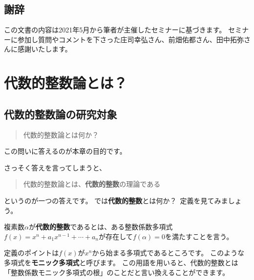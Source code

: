 \documentclass[11pt,b5paper,oneside,titlepage,lualatex]{ltjsreport}
\begin{document}
\section*{謝辞}


この文書の内容は2021年5月から筆者が主催したセミナーに基づきます。
セミナーに参加し質問やコメントを下さった庄司幸弘さん、前畑佑都さん、田中拓弥さんに感謝いたします。

\clearpage

\tableofcontents


\chapter{代数的整数論とは？} \label{chap:代数的整数論とは}



\section{代数的整数論の研究対象} \label{sec:代数的整数論の研究対象}


\begin{quote}
	\centering
	代数的整数論とは何か？
\end{quote}
この問いに答えるのが本章の目的です。

さっそく答えを言ってしまうと、
\begin{quote}
	\centering
	代数的整数論とは、\textbf{代数的整数}の理論である
\end{quote}
というのが一つの答えです。
では\textbf{代数的整数}とは何か？\,
定義を見てみましょう。

\begin{definition}{}{}
	複素数$ \alpha $が\textbf{代数的整数}であるとは、ある整数係数多項式$ f(x) = x^n + a_1 x^{n-1} + \cdots + a_n $が存在して$ f(\alpha) = 0 $を満たすことを言う。
\end{definition}

定義のポイントは$ f(x) $が$ x^n $から始まる多項式であるところです。
このような多項式を\textbf{モニック多項式}と呼びます。
この用語を用いると、代数的整数とは「整数係数モニック多項式の根」のことだと言い換えることができます。
\end{document}
